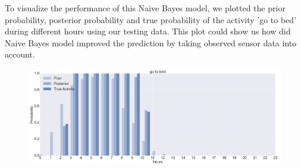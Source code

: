 \documentclass[10pt,letter]{article}
\numberwithin{equation}{section} %
\numberwithin{figure}{section} %
\numberwithin{table}{section} %
\begin{document}
To visualize the performance of this Naive Bayes model, we plotted the prior probability, posterior probability and true probability of the activity 'go to bed' during different hours using our testing data. This plot could show us how did Naive Bayes model improved the prediction by taking observed sensor data into account.
\begin{figure}[h]
    \centering
    \includegraphics[width=18cm]{NB_result}
\end{figure}
\end{document}
